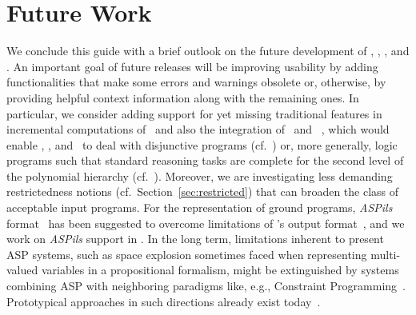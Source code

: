 \section{Future Work}\label{sec:future}

We conclude this guide with a brief outlook on the future development
of \gringo, \clasp, \clingo, and \iclingo.
An important goal of future releases will be improving usability
by adding functionalities that make some errors and warnings obsolete or,
otherwise, by providing helpful context information along with the remaining ones.
In particular, we consider adding support for yet missing traditional
features in incremental computations of \iclingo\
and also the integration of \clasp\ and \claspD~\cite{drgegrkakoossc08a},
which would enable \clasp, \clingo, and \iclingo\ to deal with disjunctive programs
(cf.~\cite{eitgot95a}) or, more generally, logic programs such that standard reasoning tasks
are complete for the second level of the polynomial hierarchy (cf.~\cite{papadimitriou94a}).
Moreover, we are investigating less demanding restrictedness notions
(cf.\ Section~\ref{sec:restricted}) that can broaden the class of
acceptable input programs.
For the representation of ground programs,
\emph{ASPils} format~\cite{gejaosscth08a} has been suggested to overcome
limitations of \lparse's output format~\cite{lparseManual},
and we work on \emph{ASPils} support in \clasp.
In the long term,
limitations inherent to present ASP systems,
such as space explosion sometimes faced when representing
multi-valued variables in a propositional formalism,
might be extinguished by systems combining ASP with
neighboring paradigms like, e.g., Constraint Programming~\cite{robewa06a}.
Prototypical approaches in such directions already exist
today~\cite{melgel08a,niolti06a}.


